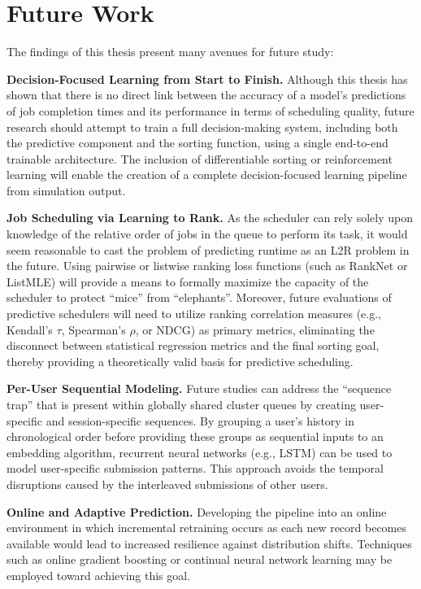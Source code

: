 \section{Future Work}

The findings of this thesis present many avenues for future study:

\textbf{Decision-Focused Learning from Start to Finish.} Although this thesis has shown that there is no direct link between the accuracy of a model's predictions of job completion times and its performance in terms of scheduling quality, future research should attempt to train a full decision-making system, including both the predictive component and the sorting function, using a single end-to-end trainable architecture. The inclusion of differentiable sorting or reinforcement learning will enable the creation of a complete decision-focused learning pipeline from simulation output.

\textbf{Job Scheduling via Learning to Rank.} As the scheduler can rely solely upon knowledge of the relative order of jobs in the queue to perform its task, it would seem reasonable to cast the problem of predicting runtime as an L2R problem in the future. Using pairwise or listwise ranking loss functions (such as RankNet or ListMLE) will provide a means to formally maximize the capacity of the scheduler to protect ``mice'' from ``elephants''. Moreover, future evaluations of predictive schedulers will need to utilize ranking correlation measures (e.g., Kendall's $\tau$, Spearman's $\rho$, or NDCG) as primary metrics, eliminating the disconnect between statistical regression metrics and the final sorting goal, thereby providing a theoretically valid basis for predictive scheduling.

\textbf{Per-User Sequential Modeling.} Future studies can address the ``sequence trap'' that is present within globally shared cluster queues by creating user-specific and session-specific sequences. By grouping a user's history in chronological order before providing these groups as sequential inputs to an embedding algorithm, recurrent neural networks (e.g., LSTM) can be used to model user-specific submission patterns. This approach avoids the temporal disruptions caused by the interleaved submissions of other users.

\textbf{Online and Adaptive Prediction.} Developing the pipeline into an online environment in which incremental retraining occurs as each new record becomes available would lead to increased resilience against distribution shifts. Techniques such as online gradient boosting or continual neural network learning may be employed toward achieving this goal.

